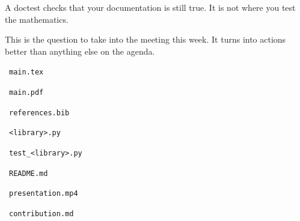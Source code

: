 \vspace{0.2cm}

{\small\color{inkgrey} A doctest checks that your documentation is still
true. It is not where you test the mathematics.}

\newpage
{}

\vspace{0.5cm}


\vspace{0.3em}

\begin{center}
\end{center}

\vspace{0.2cm}

{\small\color{inkgrey} This is the question to take into the meeting this
week. It turns into actions better than anything else on the agenda.}

\newpage
{}

\vspace{1.0cm}

\begin{minipage}[t]{0.48\linewidth}
\vspace{0pt}
{\LARGE
\blank[0.7]\ \texttt{main.tex}

\vspace{0.8em}

\blank[0.7]\ \texttt{main.pdf}

\vspace{0.8em}

\blank[0.7]\ \texttt{references.bib}

\vspace{0.8em}

\blank[0.7]\ \texttt{<library>.py}}
\end{minipage}
\hfill
\begin{minipage}[t]{0.48\linewidth}
\vspace{0pt}
{\LARGE
\blank[0.7]\ \texttt{test\_<library>.py}

\vspace{0.8em}

\blank[0.7]\ \texttt{README.md}

\vspace{0.8em}

\blank[0.7]\ \texttt{presentation.mp4}

\vspace{0.8em}

\blank[0.7]\ \texttt{contribution.md}}
\end{minipage}

